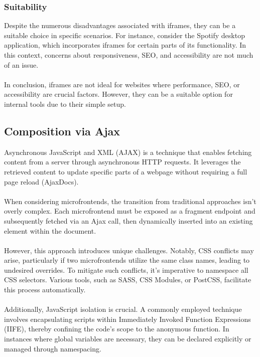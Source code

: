\subsubsection{Suitability}
Despite the numerous disadvantages associated with iframes, they can be a suitable choice in specific scenarios. For instance, consider the Spotify desktop application, which incorporates iframes for certain parts of its functionality. In this context, concerns about responsiveness, SEO, and accessibility are not much of an issue.\\\\
In conclusion, iframes are not ideal for websites where performance, SEO, or accessibility are crucial factors. However, they can be a suitable option for internal tools due to their simple setup. \cite{MFInAction}

\subsection{Composition via Ajax}
Asynchronous JavaScript and XML (AJAX) is a technique that enables fetching content from a server through asynchronous HTTP requests. It leverages the retrieved content to update specific parts of a webpage without requiring a full page reload (AjaxDocs).\cite{AjaxDocs} \\\\
When considering microfrontends, the transition from traditional approaches isn't overly complex. Each microfrontend must be exposed as a fragment endpoint and subsequently fetched via an Ajax call, then dynamically inserted into an existing element within the document. \\\\
However, this approach introduces unique challenges. Notably, CSS conflicts may arise, particularly if two microfrontends utilize the same class names, leading to undesired overrides. To mitigate such conflicts, it's imperative to namespace all CSS selectors. Various tools, such as SASS, CSS Modules, or PostCSS, facilitate this process automatically.\\\\
Additionally, JavaScript isolation is crucial. A commonly employed technique involves encapsulating scripts within Immediately Invoked Function Expressions (IIFE), thereby confining the code's scope to the anonymous function. In instances where global variables are necessary, they can be declared explicitly or managed through namespacing. \cite{MFInAction}

